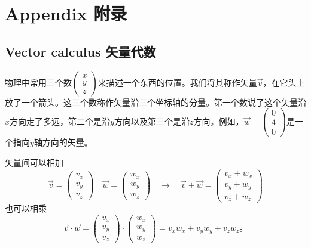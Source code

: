 
\appendix
\part{Appendix 附录}
\chapter[矢量代数]{Vector calculus 矢量代数}\label{appendix.A}
物理中常用三个数$ \begin{pmatrix}
x \\ y \\ z
\end{pmatrix}$来描述一个东西的位置。我们将其称作矢量$\vec{v}$，在它头上放了一个箭头。这三个数称作矢量沿三个坐标轴的分量。第一个数说了这个矢量沿$x$方向走了多远，第二个是沿$y$方向以及第三个是沿$z$方向。例如，$\vec{w}= \begin{pmatrix}
0 \\ 4 \\ 0
\end{pmatrix}$是一个指向$y$轴方向的矢量。


矢量间可以相加
\begin{equation}
\vec{v} = \begin{pmatrix}
v_x \\ v_y \\ v_z
\end{pmatrix} \quad
\vec{w} = \begin{pmatrix}
w_x \\ w_y \\ w_z
\end{pmatrix} \quad \rightarrow \quad
\vec{v}+\vec{w}= \begin{pmatrix}
v_x+w_x \\ v_y+w_y \\ v_z+w_z
\end{pmatrix}
\end{equation}
也可以相乘
\begin{equation}
\vec{v}\cdot\vec{w} = \begin{pmatrix}
v_x \\ v_y \\ v_z
\end{pmatrix} \cdot \begin{pmatrix}
w_x \\ w_y \\ w_z
\end{pmatrix} =
v_xw_x +v_yw_y +v_zw_z\text{。}
\end{equation}

